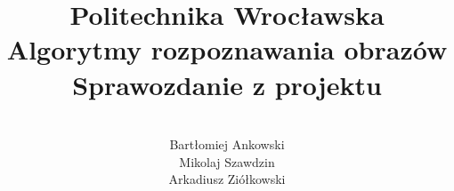 \documentclass[a4paper,12pt]{article}
\title{\Huge \textbf{Politechnika Wrocławska\\[0.3in]} 
  \huge Algorytmy rozpoznawania obrazów \\[0.2in]
  \LARGE Sprawozdanie z projektu
}
\date{}
\author{
 	\quad	\\
  Bartłomiej Ankowski\\
  Mikolaj Szawdzin\\
  Arkadiusz Ziółkowski\\
}
\begin{document}
\maketitle
\pagebreak

\tableofcontents
\pagebreak






\end{document}
